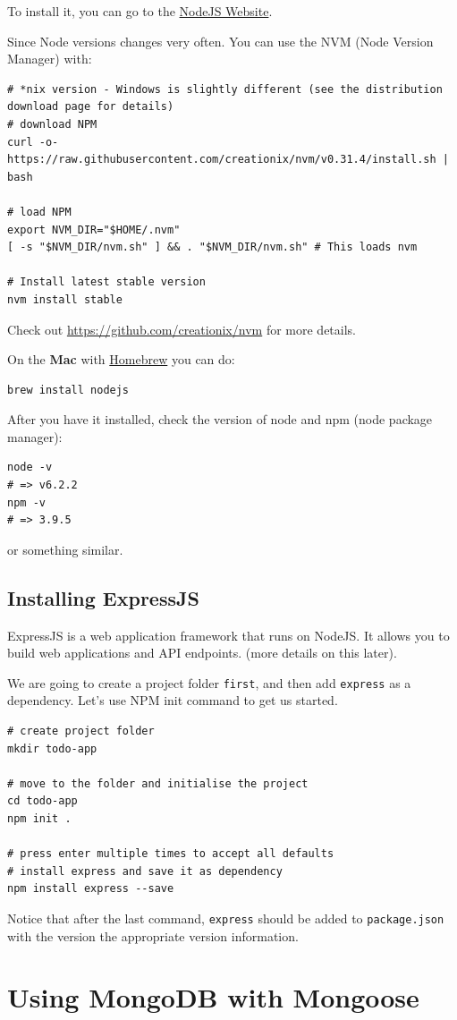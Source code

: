 \documentclass[12pt]{article}
\begin{document}
To install it, you can go to the \href{http://nodejs.org/}{NodeJS Website}.

Since Node versions changes very often. You can use the NVM (Node
Version Manager) with:
\begin{Verbatim}
# *nix version - Windows is slightly different (see the distribution download page for details)
# download NPM
curl -o- https://raw.githubusercontent.com/creationix/nvm/v0.31.4/install.sh | bash

# load NPM
export NVM_DIR="$HOME/.nvm"
[ -s "$NVM_DIR/nvm.sh" ] && . "$NVM_DIR/nvm.sh" # This loads nvm

# Install latest stable version
nvm install stable
\end{Verbatim}
Check out \url{https://github.com/creationix/nvm} for more details.

On the \textbf{Mac} with \href{http://brew.sh}{Homebrew} you can do:
\begin{Verbatim}
brew install nodejs
\end{Verbatim}
After you have it installed, check the version of node and npm (node package
manager):
\begin{Verbatim}
node -v
# => v6.2.2
npm -v
# => 3.9.5
\end{Verbatim}
or something similar.

\subsection{Installing ExpressJS}

ExpressJS is a web application framework that runs on NodeJS. It allows
you to build web applications and API endpoints. (more details on this later).

We are going to create a project folder \verb!first!, and then add
\texttt{express} as a dependency. Let's use NPM init command to get us
started.
\begin{Verbatim}
# create project folder
mkdir todo-app

# move to the folder and initialise the project
cd todo-app
npm init .  

# press enter multiple times to accept all defaults
# install express and save it as dependency
npm install express --save
\end{Verbatim}
Notice that after the last command, \texttt{express} should be added to
\verb!package.json! with the version the appropriate version information.

\section{Using MongoDB with Mongoose}
\end{document}
